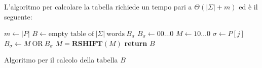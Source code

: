 L'algoritmo per calcolare la tabella richiede un tempo pari a $\Theta(|\Sigma| +
    m)$ ed è il seguente:
\begin{algorithm}
    \begin{algorithmic}
        \State $m \gets |P|$
        \State $B \gets \text{empty table of} \ |\Sigma| \ \text{words} \ B_{\sigma}$
        \For{$\sigma \in \Sigma$}
        \State $B_{\sigma} \gets 00\dots0$
        \EndFor
        \State $M \gets 10\dots0$
        \For{$\sigma \in \Sigma$}
        \State $\sigma \gets P[j]$
        \State $B_{\sigma} \gets M \ \text{OR} \ B_{\sigma}$
        \State $M = \textbf{RSHIFT} (M)$
        \EndFor
        \State \textbf{return} $B$
        \EndFunction
    \end{algorithmic}
    \caption{Algoritmo per il calcolo della tabella $B$}
\end{algorithm}
